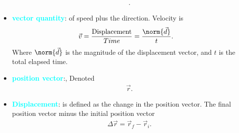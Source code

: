 \documentclass{report}
\begin{document}
\begin{itemize}
\begin{align*}
        .\end{align*}
        \pagebreak 
    \item \textbf{\textcolor{cyan}{vector quantity}}: of speed plus the direction. Velocity is 
        \begin{align*}
            \vec{v} &=\frac{\text{Displacement}}{Time} = \frac{\norm{\vec{d}}}{t}
        .\end{align*}
        Where $\norm{\vec{d}}$ is the magnitude of the displacement vector, and $t$ is the total elapsed time.
    \item \textbf{\textcolor{cyan}{position vector}}:, Denoted
        \begin{align*}
            \vec{r}
        .\end{align*}
        \bigbreak \noindent 
    \begin{figure}[ht]
        \centering
        \label{fig:try2}
    \end{figure}
    \item \textbf{\textcolor{cyan}{Displacement}}: is defined as the change in the position vector. The final position vector minus the initial position vector
        \begin{align*}
            \Delta \vec{r} = \vec{r}_{f} - \vec{r}_{i}
        .\end{align*}
    \begin{figure}[ht]
        \centering
        \label{fig:hellowrold}
    \end{figure}






    \end{itemize}

    \pagebreak 
\end{document}
